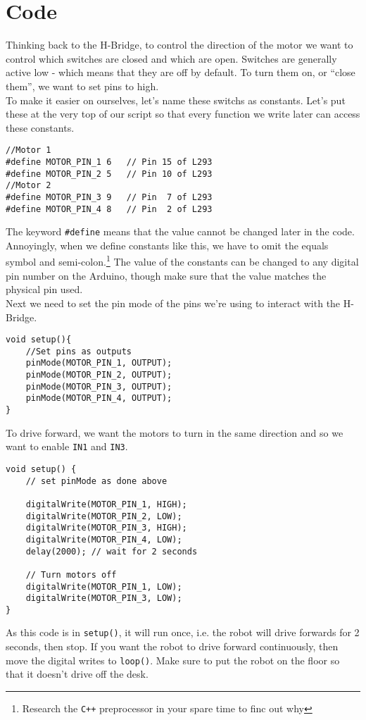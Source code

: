 \documentclass[../TinyBot.tex]{subfiles}
\begin{document}
\section{Code}

Thinking back to the H-Bridge, to control the direction of the motor we want to control which
switches are closed and which are open. Switches are generally active low - which means that 
they are off by default. To turn them on, or ``close them'', we want to set pins to high. \\

To make it easier on ourselves, let's name these switchs as constants. Let's put these
at the very top of our script so that every function we write later can access these constants. \\

\begin{lstlisting}
//Motor 1
#define MOTOR_PIN_1 6   // Pin 15 of L293
#define MOTOR_PIN_2 5   // Pin 10 of L293
//Motor 2
#define MOTOR_PIN_3 9   // Pin  7 of L293
#define MOTOR_PIN_4 8   // Pin  2 of L293
\end{lstlisting}

The keyword \lstinline[]!#define! means that the value cannot be changed later in the code.
Annoyingly, when we define constants like this, we have to omit the equals symbol and
semi-colon.\footnote{Research the \lstinline[]!C++! preprocessor in your spare time to
finc out why} The value of the constants can be changed to any digital pin number on the
Arduino, though make sure that the value matches the physical pin used. \\

Next we need to set the pin mode of the pins we're using to interact with the H-Bridge.

\begin{lstlisting}
void setup(){
    //Set pins as outputs
    pinMode(MOTOR_PIN_1, OUTPUT);
    pinMode(MOTOR_PIN_2, OUTPUT);
    pinMode(MOTOR_PIN_3, OUTPUT);
    pinMode(MOTOR_PIN_4, OUTPUT);
}
\end{lstlisting}

To drive forward, we want the motors to turn in the same direction and so we want to
enable \lstinline[]!IN1! and \lstinline[]!IN3!. \\

\begin{lstlisting}
void setup() {
    // set pinMode as done above

    digitalWrite(MOTOR_PIN_1, HIGH);
    digitalWrite(MOTOR_PIN_2, LOW);
    digitalWrite(MOTOR_PIN_3, HIGH);
    digitalWrite(MOTOR_PIN_4, LOW);
    delay(2000); // wait for 2 seconds

    // Turn motors off
    digitalWrite(MOTOR_PIN_1, LOW);
    digitalWrite(MOTOR_PIN_3, LOW);
}
\end{lstlisting}
As this code is in \lstinline[]!setup()!, it will run once, i.e. the robot will drive forwards
for 2 seconds, then stop. If you want the robot to drive forward continuously, then move the
digital writes to \lstinline[]!loop()!. Make sure to put the robot on the floor so that it
doesn't drive off the desk. \\
\end{document}
